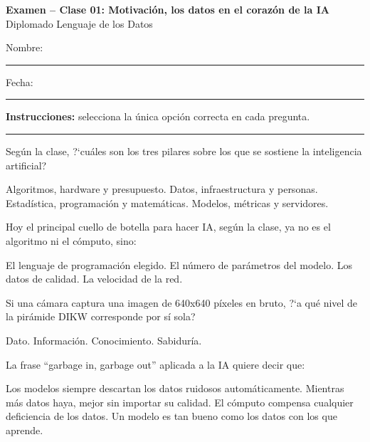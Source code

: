 \documentclass[12pt,addpoints]{exam}
\begin{document}
\begin{center}
  {\color{molMorado}\Large\bfseries Examen -- Clase 01:
   Motivaci\'on, los datos en el coraz\'on de la IA}\\[3pt]
  {\color{molTeal}\large Diplomado Lenguaje de los Datos}
\end{center}

\vspace{6pt}
\noindent Nombre: \rule{6cm}{0.4pt} \hfill Fecha: \rule{3cm}{0.4pt}

\vspace{6pt}
\noindent\textbf{Instrucciones:} selecciona la \'unica opci\'on correcta en cada
pregunta.

\vspace{4pt}
\hrule
\vspace{8pt}

\begin{questions}

\question[1] Seg\'un la clase, ?`cu\'ales son los tres pilares sobre los que se
sostiene la inteligencia artificial?
\begin{choices}
  \choice Algoritmos, hardware y presupuesto.
  \CorrectChoice Datos, infraestructura y personas.
  \choice Estad\'istica, programaci\'on y matem\'aticas.
  \choice Modelos, m\'etricas y servidores.
\end{choices}

\question[1] Hoy el principal cuello de botella para hacer IA, seg\'un la clase,
ya no es el algoritmo ni el c\'omputo, sino:
\begin{choices}
  \choice El lenguaje de programaci\'on elegido.
  \choice El n\'umero de par\'ametros del modelo.
  \CorrectChoice Los datos de calidad.
  \choice La velocidad de la red.
\end{choices}

\question[1] Si una c\'amara captura una imagen de 640x640 p\'ixeles en bruto,
?`a qu\'e nivel de la pir\'amide DIKW corresponde por s\'i sola?
\begin{choices}
  \CorrectChoice Dato.
  \choice Informaci\'on.
  \choice Conocimiento.
  \choice Sabidur\'ia.
\end{choices}

\question[1] La frase ``garbage in, garbage out'' aplicada a la IA quiere decir
que:
\begin{choices}
  \choice Los modelos siempre descartan los datos ruidosos autom\'aticamente.
  \choice Mientras m\'as datos haya, mejor sin importar su calidad.
  \choice El c\'omputo compensa cualquier deficiencia de los datos.
  \CorrectChoice Un modelo es tan bueno como los datos con los que aprende.
\end{choices}


\end{questions}
\end{document}
